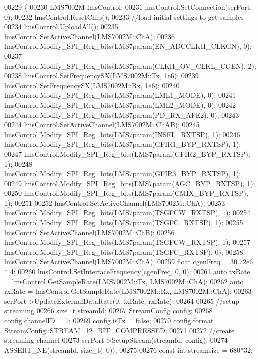 \begin{DoxyCode}
{{00229 \{
00230     LMS7002M lmsControl;
00231     lmsControl.SetConnection(serPort, 0);
00232     lmsControl.ResetChip();
00233     \textcolor{comment}{//load initial settings to get samples}
00234     lmsControl.UploadAll();
00235     lmsControl.SetActiveChannel(LMS7002M::ChA);
00236     lmsControl.Modify_SPI_Reg_bits(LMS7param(EN_ADCCLKH_CLKGN), 0);
00237     lmsControl.Modify_SPI_Reg_bits(LMS7param(CLKH_OV_CLKL_CGEN), 2);
00238     lmsControl.SetFrequencySX(LMS7002M::Tx, 1e6);
00239     lmsControl.SetFrequencySX(LMS7002M::Rx, 1e6);
00240     lmsControl.Modify_SPI_Reg_bits(LMS7param(LML1_MODE), 0);
00241     lmsControl.Modify_SPI_Reg_bits(LMS7param(LML2_MODE), 0);
00242     lmsControl.Modify_SPI_Reg_bits(LMS7param(PD_RX_AFE2), 0);
00243 
00244     lmsControl.SetActiveChannel(LMS7002M::ChAB);
00245     lmsControl.Modify_SPI_Reg_bits(LMS7param(INSEL_RXTSP), 1);
00246     lmsControl.Modify_SPI_Reg_bits(LMS7param(GFIR1_BYP_RXTSP), 1);
00247     lmsControl.Modify_SPI_Reg_bits(LMS7param(GFIR2_BYP_RXTSP), 1);
00248     lmsControl.Modify_SPI_Reg_bits(LMS7param(GFIR3_BYP_RXTSP), 1);
00249     lmsControl.Modify_SPI_Reg_bits(LMS7param(AGC_BYP_RXTSP), 1);
00250     lmsControl.Modify_SPI_Reg_bits(LMS7param(CMIX_BYP_RXTSP), 1);
00251 
00252     lmsControl.SetActiveChannel(LMS7002M::ChA);
00253     lmsControl.Modify_SPI_Reg_bits(LMS7param(TSGFCW_RXTSP), 1);
00254     lmsControl.Modify_SPI_Reg_bits(LMS7param(TSGFC_RXTSP), 1);
00255     lmsControl.SetActiveChannel(LMS7002M::ChB);
00256     lmsControl.Modify_SPI_Reg_bits(LMS7param(TSGFCW_RXTSP), 1);
00257     lmsControl.Modify_SPI_Reg_bits(LMS7param(TSGFC_RXTSP), 0);
00258     lmsControl.SetActiveChannel(LMS7002M::ChA);
00259     \textcolor{keywordtype}{float} cgenFreq = 30.72e6 * 4;
00260     lmsControl.SetInterfaceFrequency(cgenFreq, 0, 0);
00261     \textcolor{keyword}{auto} txRate = lmsControl.GetSampleRate(LMS7002M::Tx, LMS7002M::ChA);
00262     \textcolor{keyword}{auto} rxRate = lmsControl.GetSampleRate(LMS7002M::Rx, LMS7002M::ChA);
00263     serPort->UpdateExternalDataRate(0, txRate, rxRate);
00264 
00265     \textcolor{comment}{//setup streaming}
00266     \textcolor{keywordtype}{size\_t} streamId;
00267     StreamConfig config;
00268     config.channelID = 1;
00269     config.isTx = \textcolor{keyword}{false};
00270     config.format = StreamConfig::STREAM\_12\_BIT\_COMPRESSED;
00271 
00272     \textcolor{comment}{//create streaming channel}
00273     serPort->SetupStream(streamId, config);
00274     ASSERT\_NE(streamId, \textcolor{keywordtype}{size\_t}(~0));
00275 
00276     \textcolor{keyword}{const} \textcolor{keywordtype}{int} streamsize = 680*32;
}}
\end{DoxyCode}
